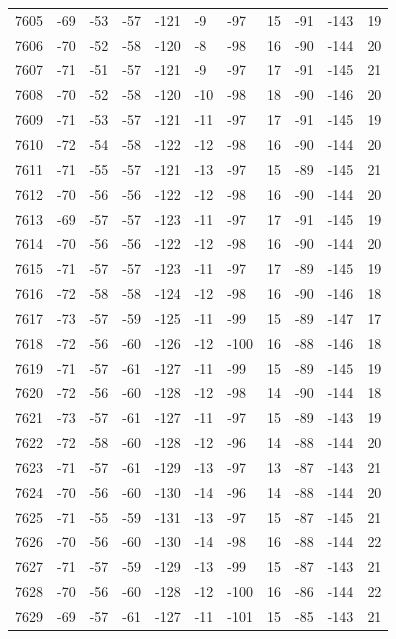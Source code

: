 \begin{table}[H]
\begin{tabular}{lllllllllll}
7605 & -69 & -53 & -57 & -121 & -9 & -97 & 15 & -91 & -143 & 19 \\
7606 & -70 & -52 & -58 & -120 & -8 & -98 & 16 & -90 & -144 & 20 \\
7607 & -71 & -51 & -57 & -121 & -9 & -97 & 17 & -91 & -145 & 21 \\
7608 & -70 & -52 & -58 & -120 & -10 & -98 & 18 & -90 & -146 & 20 \\
7609 & -71 & -53 & -57 & -121 & -11 & -97 & 17 & -91 & -145 & 19 \\
7610 & -72 & -54 & -58 & -122 & -12 & -98 & 16 & -90 & -144 & 20 \\
7611 & -71 & -55 & -57 & -121 & -13 & -97 & 15 & -89 & -145 & 21 \\
7612 & -70 & -56 & -56 & -122 & -12 & -98 & 16 & -90 & -144 & 20 \\
7613 & -69 & -57 & -57 & -123 & -11 & -97 & 17 & -91 & -145 & 19 \\
7614 & -70 & -56 & -56 & -122 & -12 & -98 & 16 & -90 & -144 & 20 \\
7615 & -71 & -57 & -57 & -123 & -11 & -97 & 17 & -89 & -145 & 19 \\
7616 & -72 & -58 & -58 & -124 & -12 & -98 & 16 & -90 & -146 & 18 \\
7617 & -73 & -57 & -59 & -125 & -11 & -99 & 15 & -89 & -147 & 17 \\
7618 & -72 & -56 & -60 & -126 & -12 & -100 & 16 & -88 & -146 & 18 \\
7619 & -71 & -57 & -61 & -127 & -11 & -99 & 15 & -89 & -145 & 19 \\
7620 & -72 & -56 & -60 & -128 & -12 & -98 & 14 & -90 & -144 & 18 \\
7621 & -73 & -57 & -61 & -127 & -11 & -97 & 15 & -89 & -143 & 19 \\
7622 & -72 & -58 & -60 & -128 & -12 & -96 & 14 & -88 & -144 & 20 \\
7623 & -71 & -57 & -61 & -129 & -13 & -97 & 13 & -87 & -143 & 21 \\
7624 & -70 & -56 & -60 & -130 & -14 & -96 & 14 & -88 & -144 & 20 \\
7625 & -71 & -55 & -59 & -131 & -13 & -97 & 15 & -87 & -145 & 21 \\
7626 & -70 & -56 & -60 & -130 & -14 & -98 & 16 & -88 & -144 & 22 \\
7627 & -71 & -57 & -59 & -129 & -13 & -99 & 15 & -87 & -143 & 21 \\
7628 & -70 & -56 & -60 & -128 & -12 & -100 & 16 & -86 & -144 & 22 \\
7629 & -69 & -57 & -61 & -127 & -11 & -101 & 15 & -85 & -143 & 21 \\

\end{tabular}
\end{table}
